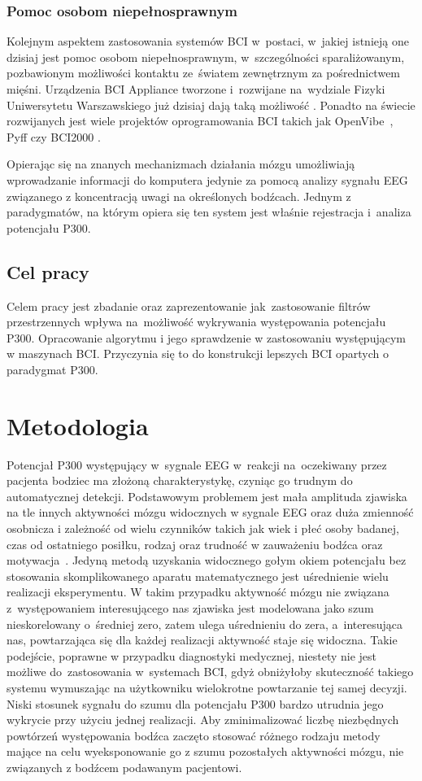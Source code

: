 \documentclass[licencjacka,openright]{pracamgr}
\begin{document}
\subsection{Pomoc osobom niepełnosprawnym}
Kolejnym aspektem zastosowania systemów BCI w~postaci, w~jakiej istnieją one dzisiaj jest pomoc osobom niepełnosprawnym, w~szczególności sparaliżowanym, pozbawionym możliwości kontaktu ze~światem zewnętrznym za pośrednictwem mięśni. Urządzenia BCI Appliance tworzone i~rozwijane na~wydziale Fizyki Uniwersytetu Warszawskiego już dzisiaj dają taką możliwość \citep{obci}.
Ponadto na świecie rozwijanych jest wiele projektów oprogramowania BCI takich jak OpenVibe~\citep{renard2010}, Pyff \citep{venthur2008} czy BCI2000 \citep{schalk2004}.

Opierając się na znanych mechanizmach działania mózgu umożliwiają wprowadzanie informacji do komputera jedynie za pomocą analizy sygnału EEG związanego z koncentracją uwagi na określonych bodźcach. Jednym z paradygmatów, na którym opiera się ten system jest właśnie rejestracja i~analiza potencjału P300.

\section{Cel pracy}
Celem pracy jest zbadanie oraz zaprezentowanie jak~zastosowanie filtrów przestrzennych wpływa na~możliwość wykrywania występowania potencjału P300. Opracowanie
algorytmu i jego sprawdzenie w zastosowaniu występującym w maszynach BCI. Przyczynia się to do konstrukcji lepszych BCI opartych o paradygmat P300.

\chapter{Metodologia}
Potencjał P300 występujący w~sygnale EEG w~reakcji na~oczekiwany przez pacjenta bodziec ma złożoną charakterystykę, czyniąc go trudnym do automatycznej detekcji. Podstawowym problemem jest mała amplituda zjawiska na tle innych aktywności mózgu widocznych w sygnale EEG oraz duża zmienność osobnicza i zależność od wielu czynników takich jak wiek i płeć osoby badanej, czas od ostatniego posiłku, rodzaj oraz trudność w zauważeniu bodźca oraz motywacja~\citep{chudzik2004}.
Jedyną metodą uzyskania widocznego gołym okiem potencjału bez stosowania skomplikowanego aparatu matematycznego jest uśrednienie wielu realizacji eksperymentu. W takim przypadku aktywność mózgu nie związana z~występowaniem interesującego nas zjawiska jest modelowana jako szum nieskorelowany o~średniej zero, zatem ulega uśrednieniu do zera, a~interesująca nas, powtarzająca się dla każdej realizacji aktywność staje się widoczna. Takie podejście, poprawne w przypadku diagnostyki medycznej, niestety nie jest możliwe do~zastosowania w~systemach BCI, gdyż obniżyłoby skuteczność takiego systemu wymuszając na użytkowniku wielokrotne powtarzanie tej samej decyzji. Niski stosunek sygnału do szumu dla potencjału P300 bardzo utrudnia jego wykrycie przy użyciu jednej realizacji. Aby zminimalizować liczbę niezbędnych powtórzeń występowania bodźca zaczęto stosować różnego rodzaju metody mające na celu wyeksponowanie go z szumu pozostałych aktywności mózgu, nie związanych z bodźcem podawanym pacjentowi.
\end{document}
